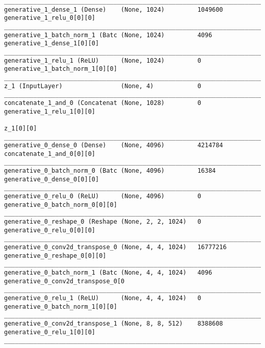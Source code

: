 \begin{lstlisting}[caption={\textsc{Mnist}-\ac{VLAE}-\ac{GAN} Decoder},captionpos=b,basicstyle=\tiny, label={lst:mnist-vlae-gan-decoder}]
__________________________________________________________________________________________________
generative_1_dense_1 (Dense)    (None, 1024)         1049600     generative_1_relu_0[0][0]
__________________________________________________________________________________________________
generative_1_batch_norm_1 (Batc (None, 1024)         4096        generative_1_dense_1[0][0]
__________________________________________________________________________________________________
generative_1_relu_1 (ReLU)      (None, 1024)         0           generative_1_batch_norm_1[0][0]
__________________________________________________________________________________________________
z_1 (InputLayer)                (None, 4)            0
__________________________________________________________________________________________________
concatenate_1_and_0 (Concatenat (None, 1028)         0           generative_1_relu_1[0][0]
                                                                 z_1[0][0]
__________________________________________________________________________________________________
generative_0_dense_0 (Dense)    (None, 4096)         4214784     concatenate_1_and_0[0][0]
__________________________________________________________________________________________________
generative_0_batch_norm_0 (Batc (None, 4096)         16384       generative_0_dense_0[0][0]
__________________________________________________________________________________________________
generative_0_relu_0 (ReLU)      (None, 4096)         0           generative_0_batch_norm_0[0][0]
__________________________________________________________________________________________________
generative_0_reshape_0 (Reshape (None, 2, 2, 1024)   0           generative_0_relu_0[0][0]
__________________________________________________________________________________________________
generative_0_conv2d_transpose_0 (None, 4, 4, 1024)   16777216    generative_0_reshape_0[0][0]
__________________________________________________________________________________________________
generative_0_batch_norm_1 (Batc (None, 4, 4, 1024)   4096        generative_0_conv2d_transpose_0[0
__________________________________________________________________________________________________
generative_0_relu_1 (ReLU)      (None, 4, 4, 1024)   0           generative_0_batch_norm_1[0][0]
__________________________________________________________________________________________________
generative_0_conv2d_transpose_1 (None, 8, 8, 512)    8388608     generative_0_relu_1[0][0]
__________________________________________________________________________________________________

\end{lstlisting}
